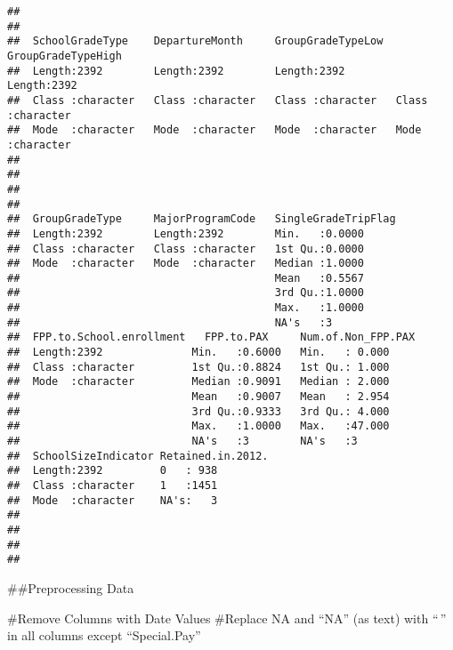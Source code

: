 \documentclass[
]{article}
\begin{document}
\begin{verbatim}
##                                                                      
##                                                                      
##  SchoolGradeType    DepartureMonth     GroupGradeTypeLow  GroupGradeTypeHigh
##  Length:2392        Length:2392        Length:2392        Length:2392       
##  Class :character   Class :character   Class :character   Class :character  
##  Mode  :character   Mode  :character   Mode  :character   Mode  :character  
##                                                                             
##                                                                             
##                                                                             
##                                                                             
##  GroupGradeType     MajorProgramCode   SingleGradeTripFlag
##  Length:2392        Length:2392        Min.   :0.0000     
##  Class :character   Class :character   1st Qu.:0.0000     
##  Mode  :character   Mode  :character   Median :1.0000     
##                                        Mean   :0.5567     
##                                        3rd Qu.:1.0000     
##                                        Max.   :1.0000     
##                                        NA's   :3          
##  FPP.to.School.enrollment   FPP.to.PAX     Num.of.Non_FPP.PAX
##  Length:2392              Min.   :0.6000   Min.   : 0.000    
##  Class :character         1st Qu.:0.8824   1st Qu.: 1.000    
##  Mode  :character         Median :0.9091   Median : 2.000    
##                           Mean   :0.9007   Mean   : 2.954    
##                           3rd Qu.:0.9333   3rd Qu.: 4.000    
##                           Max.   :1.0000   Max.   :47.000    
##                           NA's   :3        NA's   :3         
##  SchoolSizeIndicator Retained.in.2012.
##  Length:2392         0   : 938        
##  Class :character    1   :1451        
##  Mode  :character    NA's:   3        
##                                       
##                                       
##                                       
## 
\end{verbatim}

\#\#Preprocessing Data

\#Remove Columns with Date Values \#Replace NA and ``NA'' (as text) with
``\,'' in all columns except ``Special.Pay''
\end{document}

